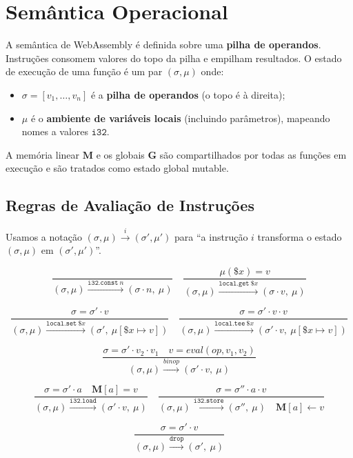 \section{Semântica Operacional}\label{sec:wat-semantics}

A semântica de WebAssembly é definida sobre uma \textbf{pilha de operandos}.
Instruções consomem valores do topo da pilha e empilham resultados.  O estado
de execução de uma função é um par $(\sigma, \mu)$ onde:

\begin{itemize}
  \item $\sigma = [v_1, \ldots, v_n]$ é a \textbf{pilha de operandos} (o topo é à direita);
  \item $\mu$ é o \textbf{ambiente de variáveis locais} (incluindo parâmetros),
    mapeando nomes a valores $\mathtt{i32}$.
\end{itemize}

A memória linear $\mathbf{M}$ e os globais $\mathbf{G}$ são compartilhados por
todas as funções em execução e são tratados como estado global mutable.

\subsection{Regras de Avaliação de Instruções}

Usamos a notação $(\sigma, \mu) \xrightarrow{i} (\sigma', \mu')$ para
``a instrução $i$ transforma o estado $(\sigma, \mu)$ em $(\sigma', \mu')$''.

\begin{Definition}\label{def:wat-instrs}
\[
\dfrac{}
      {(\sigma, \mu) \xrightarrow{\mathtt{i32.const}\ n} (\sigma \cdot n,\ \mu)}
\quad
\dfrac{\mu(\$x) = v}
      {(\sigma, \mu) \xrightarrow{\mathtt{local.get}\ \$x} (\sigma \cdot v,\ \mu)}
\]

\[
\dfrac{\sigma = \sigma' \cdot v}
      {(\sigma, \mu) \xrightarrow{\mathtt{local.set}\ \$x} (\sigma',\ \mu[\$x \mapsto v])}
\quad
\dfrac{\sigma = \sigma' \cdot v \cdot v}
      {(\sigma, \mu) \xrightarrow{\mathtt{local.tee}\ \$x} (\sigma' \cdot v,\ \mu[\$x \mapsto v])}
\]

\[
\dfrac{\sigma = \sigma' \cdot v_2 \cdot v_1 \quad v = \mathit{eval}(\mathit{op}, v_1, v_2)}
      {(\sigma, \mu) \xrightarrow{\mathit{binop}} (\sigma' \cdot v,\ \mu)}
\]

\[
\dfrac{\sigma = \sigma' \cdot a \quad \mathbf{M}[a] = v}
      {(\sigma, \mu) \xrightarrow{\mathtt{i32.load}} (\sigma' \cdot v,\ \mu)}
\quad
\dfrac{\sigma = \sigma'' \cdot a \cdot v}
      {(\sigma, \mu) \xrightarrow{\mathtt{i32.store}} (\sigma'',\ \mu) \quad \mathbf{M}[a] \leftarrow v}
\]

\[
\dfrac{\sigma = \sigma' \cdot v}
      {(\sigma, \mu) \xrightarrow{\mathtt{drop}} (\sigma',\ \mu)}
\]
\end{Definition}

